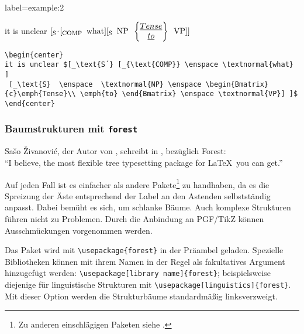 \begin{lfgwprint}{label={example:2}}
\begin{center}
it is unclear $[_\text{S´} [_{\text{COMP}} \enspace \textnormal{what} ]
 [_\text{S}  \enspace  \textnormal{NP} \enspace \begin{Bmatrix} \emph{Tense}\\ \emph{to} \end{Bmatrix} \enspace \textnormal{VP}] ]$
\end{center}
\end{lfgwprint}

\lstset{frame=single}
\begin{lstlisting}
\begin{center}
it is unclear $[_\text{S´} [_{\text{COMP}} \enspace \textnormal{what} ]
 [_\text{S}  \enspace  \textnormal{NP} \enspace \begin{Bmatrix}{c}\emph{Tense}\\ \emph{to} \end{Bmatrix} \enspace \textnormal{VP}] ]$
\end{center}
\end{lstlisting}


\subsubsection{Baumstrukturen mit \texttt{forest}}

Sa\v{s}o \v{Z}ivanovi\'{c}, der Autor von , schreibt in \cite[3]{forest-doc},
bezüglich Forest: \\
"`I believe, the most flexible tree typesetting package for \LaTeX\ you can get."'

Auf jeden Fall ist es einfacher als andere Pakete\footnote{Zu anderen einschlägigen Paketen siehe \cite{roemer}.} zu handhaben, da es die Spreizung
der Äste entsprechend der Label an den Astenden selbstständig anpasst. Dabei bemüht es sich,
um schlanke Bäume. Auch komplexe Strukturen führen nicht zu Problemen. Durch die Anbindung
an PGF/TikZ können Ausschmückungen vorgenommen werden.


Das Paket wird mit \verb|\usepackage{forest}| in der Präambel geladen. Spezielle Bibliotheken
können mit ihrem Namen in der Regel als fakultatives Argument hinzugefügt werden: 
\verb|\usepackage[library name]{forest}|; beispielsweise diejenige für linguistische Strukturen
mit \verb|\usepackage[linguistics]{forest}|. Mit dieser Option werden die Strukturbäume
standardmäßig linksverzweigt.


